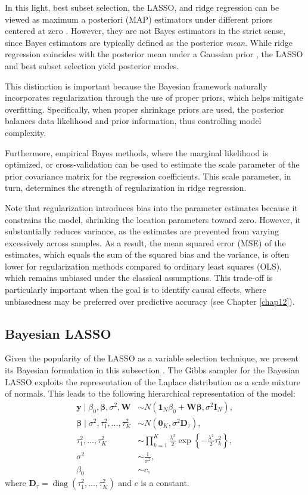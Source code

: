 In this light, best subset selection, the LASSO, and ridge regression can be viewed as maximum a posteriori (MAP) estimators under different priors centered at zero \cite{Park2008}. However, they are not Bayes estimators in the strict sense, since Bayes estimators are typically defined as the posterior \textit{mean}. While ridge regression coincides with the posterior mean under a Gaussian prior \cite{Ishwaran2005}, the LASSO and best subset selection yield posterior modes.

This distinction is important because the Bayesian framework naturally incorporates regularization through the use of proper priors, which helps mitigate overfitting. Specifically, when proper shrinkage priors are used, the posterior balances data likelihood and prior information, thus controlling model complexity.

Furthermore, empirical Bayes methods, where the marginal likelihood is optimized, or cross-validation can be used to estimate the scale parameter of the prior covariance matrix for the regression coefficients. This scale parameter, in turn, determines the strength of regularization in ridge regression.

Note that regularization introduces bias into the parameter estimates because it constrains the model, shrinking the location parameters toward zero. However, it substantially reduces variance, as the estimates are prevented from varying excessively across samples. As a result, the mean squared error (MSE) of the estimates, which equals the sum of the squared bias and the variance, is often lower for regularization methods compared to ordinary least squares (OLS), which remains unbiased under the classical assumptions. This trade-off is particularly important when the goal is to identify causal effects, where unbiasedness may be preferred over predictive accuracy (see Chapter \ref{chap12}).

\subsection{Bayesian LASSO}\label{sec13_21}
Given the popularity of the LASSO as a variable selection technique, we present its Bayesian formulation in this subsection \cite{Park2008}. The Gibbs sampler for the Bayesian LASSO exploits the representation of the Laplace distribution as a scale mixture of normals. This leads to the following hierarchical representation of the model:
\begin{align*}
	\mathbf{y} \mid \beta_0, \boldsymbol{\beta}, \sigma^2, \mathbf{W} &\sim {N}(\mathbf{1}_N \beta_0 + \mathbf{W} \boldsymbol{\beta}, \sigma^2 \mathbf{I}_N), \\
	\boldsymbol{\beta} \mid \sigma^2, \tau_1^2, \dots, \tau_K^2 &\sim {N}(\mathbf{0}_K, \sigma^2 \mathbf{D}_{\tau}), \\
	\tau_1^2, \dots, \tau_K^2 &\sim \prod_{k=1}^K \frac{\lambda^2}{2} \exp\left\{ -\frac{\lambda^2}{2} \tau_k^2 \right\}, \\
	\sigma^2 &\sim \frac{1}{\sigma^2},\\
	\beta_0&\sim c,
\end{align*}
where $\mathbf{D}_{\tau} = \operatorname{diag}(\tau_1^2, \dots, \tau_K^2)$ and $c$ is a constant. 

